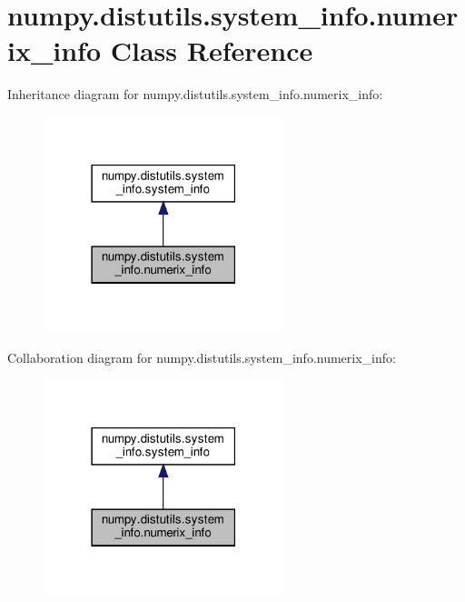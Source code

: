 \hypertarget{classnumpy_1_1distutils_1_1system__info_1_1numerix__info}{}\section{numpy.\+distutils.\+system\+\_\+info.\+numerix\+\_\+info Class Reference}
\label{classnumpy_1_1distutils_1_1system__info_1_1numerix__info}


Inheritance diagram for numpy.\+distutils.\+system\+\_\+info.\+numerix\+\_\+info\+:
\nopagebreak
\begin{figure}[H]
\begin{center}
\leavevmode
\includegraphics[width=198pt]{classnumpy_1_1distutils_1_1system__info_1_1numerix__info__inherit__graph}
\end{center}
\end{figure}


Collaboration diagram for numpy.\+distutils.\+system\+\_\+info.\+numerix\+\_\+info\+:
\nopagebreak
\begin{figure}[H]
\begin{center}
\leavevmode
\includegraphics[width=198pt]{classnumpy_1_1distutils_1_1system__info_1_1numerix__info__coll__graph}
\end{center}
\end{figure}

